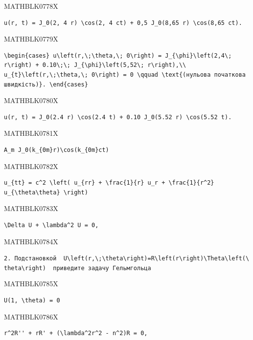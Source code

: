 \documentclass[
  ukrainian,
]{article}
\begin{document}
MATHBLK0778X

\begin{verbatim}
u(r, t) = J_0(2, 4 r) \cos(2, 4 ct) + 0,5 J_0(8,65 r) \cos(8,65 ct).
\end{verbatim}

MATHBLK0779X

\begin{verbatim}
\begin{cases} u\left(r,\;\theta,\; 0\right) = J_{\phi}\left(2,4\; r\right) + 0.10\;\; J_{\phi}\left(5,52\; r\right),\\ u_{t}\left(r,\;\theta,\; 0\right) = 0 \qquad \text{(нульова початкова швидкість)}. \end{cases}
\end{verbatim}

MATHBLK0780X

\begin{verbatim}
u(r, t) = J_0(2.4 r) \cos(2.4 t) + 0.10 J_0(5.52 r) \cos(5.52 t).
\end{verbatim}

MATHBLK0781X

\begin{verbatim}
A_m J_0(k_{0m}r)\cos(k_{0m}ct)
\end{verbatim}

MATHBLK0782X

\begin{verbatim}
u_{tt} = c^2 \left( u_{rr} + \frac{1}{r} u_r + \frac{1}{r^2} u_{\theta\theta} \right)
\end{verbatim}

MATHBLK0783X

\begin{verbatim}
\Delta U + \lambda^2 U = 0,
\end{verbatim}

MATHBLK0784X

\texttt{2.\ Подстановкой\ \ \textquotesingle{}U\textbackslash{}left(r,\textbackslash{};\textbackslash{}theta\textbackslash{}right)=R\textbackslash{}left(r\textbackslash{}right)\textbackslash{}Theta\textbackslash{}left(\textbackslash{}theta\textbackslash{}right)\textquotesingle{}\ \ приведите\ задачу\ Гельмгольца}

MATHBLK0785X

\begin{verbatim}
U(1, \theta) = 0
\end{verbatim}

MATHBLK0786X

\begin{verbatim}
r^2R'' + rR' + (\lambda^2r^2 - n^2)R = 0,
\end{verbatim}
\end{document}
